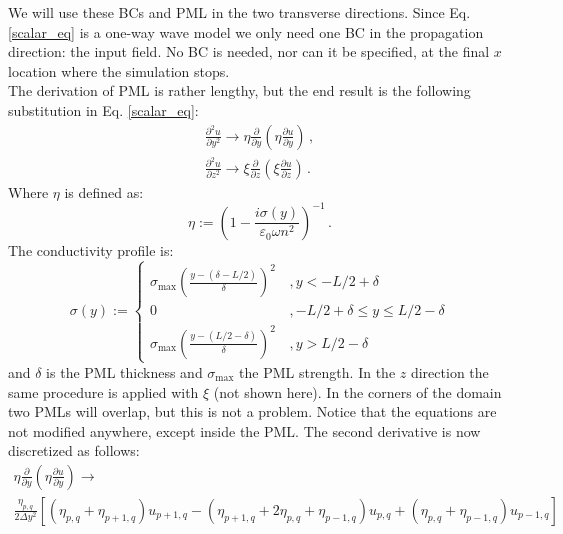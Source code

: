 \documentclass[]{article}
\begin{document}
	We will use these BCs and PML in the two transverse directions. Since Eq. \eqref{scalar_eq} is a one-way wave model we only need one BC in the propagation direction: the input field. No BC is needed, nor can it be specified, at the final $x$ location where the simulation stops.\\
	
	The derivation of PML is rather lengthy, but the end result is the following substitution in Eq. \eqref{scalar_eq}:
	\begin{subequations}
		\begin{align}
			\frac{\partial^2 u}{\partial y^2} \to \eta \frac{\partial}{\partial y}\left(  \eta \frac{\partial u}{\partial y}\right) \, ,\\
			\frac{\partial^2 u}{\partial z^2} \to \xi \frac{\partial}{\partial z}\left(  \xi \frac{\partial u}{\partial z}\right) \, .
		\end{align}
	\end{subequations}
	Where $\eta$ is defined as:
	\begin{equation}
		\eta := \left(1-\frac{i\sigma(y)}{\varepsilon_0 \omega n^2} \right)^{-1}\, .
	\end{equation}
	The conductivity profile is:
	\begin{equation}
		\sigma(y):= \begin{cases}
			\sigma_{\text{max}}\left( \frac{y-(\delta-L/2)}{\delta}\right)^2 \, &, y <-L/2+\delta\\
			0&, -L/2+\delta \le y \le L/2 - \delta\\
			\sigma_{\text{max}}\left( \frac{y-(L/2-\delta)}{\delta}\right)^2 \, &, y > L/2 - \delta
		\end{cases}
	\end{equation}
	and $\delta$ is the PML thickness and $\sigma_{\text{max}}$ the PML strength. In the $z$ direction the same procedure is applied with $\xi$ (not shown here). In the corners of the domain two PMLs will overlap, but this is not a problem. Notice that the equations are not modified anywhere, except inside the PML. The second derivative is now discretized as follows:
	\begin{multline}
		\eta \frac{\partial}{\partial y}\left(  \eta \frac{\partial u}{\partial y}\right)  \to\\
		\frac{\eta_{p,q}}{2\Delta y^2}\left[(\eta_{p,q}+\eta_{p+1,q})u_{p+1,q} -(\eta_{p+1,q}+2\eta_{p,q}+\eta_{p-1,q})u_{p,q}+(\eta_{p,q}+\eta_{p-1,q})u_{p-1,q}\right] 
	\end{multline}
	
\end{document}
